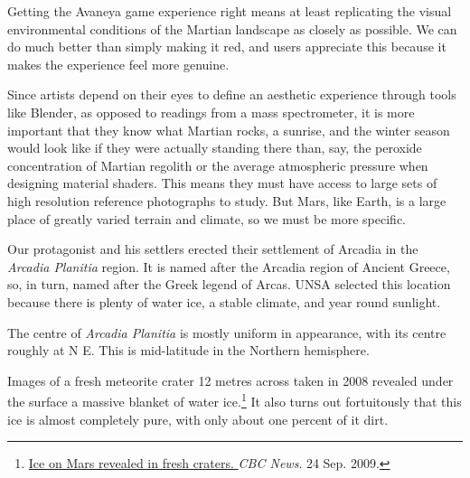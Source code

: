 


    {}
Getting the Avaneya game experience right means at least replicating the visual environmental conditions of the Martian landscape as closely as possible. We can do much better than simply making it red, and users appreciate this because it makes the experience feel more genuine.

Since artists depend on their eyes to define an aesthetic experience through tools like Blender, as opposed to readings from a mass spectrometer, it is more important that they know what Martian rocks, a sunrise, and the winter season would look like if they were actually standing there than, say, the peroxide concentration of Martian regolith or the average atmospheric pressure when designing material shaders. This means they must have access to large sets of high resolution reference photographs to study. But Mars, like Earth, is a large place of greatly varied terrain and climate, so we must be more specific.

Our protagonist  and his settlers erected their settlement of Arcadia in the {\it Arcadia Planitia} region. It is named after the Arcadia region of Ancient Greece, so, in turn, named after the Greek legend of Arcas. UNSA selected this location because there is plenty of water ice, a stable climate, and year round sunlight.

The centre of {\it Arcadia Planitia} is mostly uniform in appearance, with its centre roughly at N E. This is mid-latitude in the Northern hemisphere. 

Images of a fresh meteorite crater 12 metres across taken in 2008 revealed under the surface a massive blanket of water ice.\footnote{\href{http://www.cbc.ca/news/technology/story/2009/09/24/tech-space-water-mars-crater.html}{Ice on Mars revealed in fresh craters. }{\it CBC News}. 24 Sep. 2009.} It also turns out fortuitously that this ice is almost completely pure, with only about one percent of it dirt.

